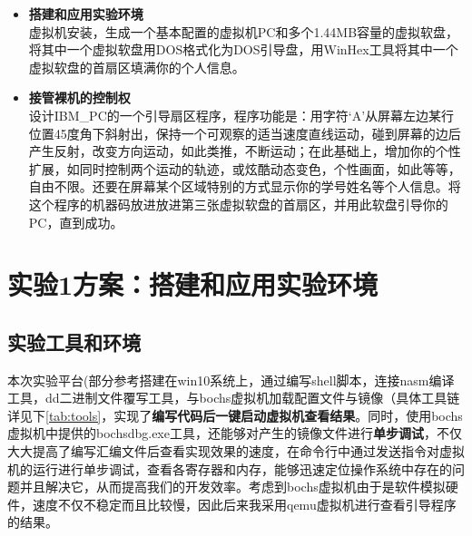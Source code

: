 \documentclass[forprint]{WHUBachelor}
\begin{document}
\begin{itemize}
  \item \textbf{搭建和应用实验环境} \\
  虚拟机安装，生成一个基本配置的虚拟机PC和多个1.44MB容量的虚拟软盘，将其中一个虚拟软盘用DOS格式化为DOS引导盘，用WinHex工具将其中一个虚拟软盘的首扇区填满你的个人信息。
  \item \textbf{接管裸机的控制权} \\
  设计IBM\_PC的一个引导扇区程序，程序功能是：用字符‘A’从屏幕左边某行位置45度角下斜射出，保持一个可观察的适当速度直线运动，碰到屏幕的边后产生反射，改变方向运动，如此类推，不断运动；在此基础上，增加你的个性扩展，如同时控制两个运动的轨迹，或炫酷动态变色，个性画面，如此等等，自由不限。还要在屏幕某个区域特别的方式显示你的学号姓名等个人信息。将这个程序的机器码放进放进第三张虚拟软盘的首扇区，并用此软盘引导你的PC，直到成功。
\end{itemize}

\chapter{实验1方案：搭建和应用实验环境}


\section{实验工具和环境}

本次实验平台(部分参考\cite{于渊2009orange}搭建在win10系统上，通过编写shell脚本，连接nasm编译工具，dd二进制文件覆写工具，与bochs虚拟机加载配置文件与镜像（具体工具链详见下\autoref{tab:tools}，实现了\textbf{编写代码后一键启动虚拟机查看结果}。同时，使用bochs虚拟机中提供的bochsdbg.exe工具，还能够对产生的镜像文件进行\textbf{单步调试}，不仅大大提高了编写汇编文件后查看实现效果的速度，在命令行中通过发送指令对虚拟机的运行进行单步调试，查看各寄存器和内存，能够迅速定位操作系统中存在的问题并且解决它，从而提高我们的开发效率。考虑到bochs虚拟机由于是软件模拟硬件，速度不仅不稳定而且比较慢，因此后来我采用qemu虚拟机进行查看引导程序的结果。
\end{document}
